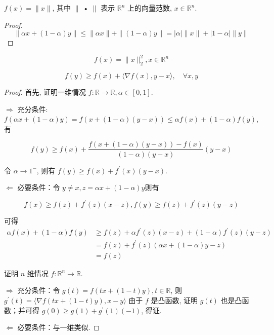 \begin{example}
    \label{Example:NormIsConvex}
    $ f(x)=\|x\| $, 其中 $ \| $ • $ \| $ 表示 $ \mathbb{R}^{n} $ 上的向量范数, $ x \in \mathbb{R}^{n} $.
\end{example}

\begin{proof}
    \label{Example:L2NormIsConvex}
    $$ \|\alpha x+(1-\alpha) y\| \leq\|\alpha x\|+\|(1-\alpha) y\|=|\alpha|\|x\|+|1-\alpha|\|y\| $$
\end{proof}

\begin{example}
    $$ f(x)=\|x\|_{2}^{2}, x \in \mathbb{R}^{n} $$
\end{example}

\begin{theorem}
    \label{Theorem:ConvexDiffential}
    $$ f(y) \geq f(x)+\langle\nabla f(x), y-x\rangle, \quad \forall x, y $$
\end{theorem}

\begin{proof}
    首先, 证明一维情况 $ f: \mathbb{R} \rightarrow \mathbb{R}, \alpha \in[0,1] $.

    $ \Rightarrow  $ 充分条件: $ f(\alpha x+(1-\alpha) y)=f(x+(1-\alpha)(y-x)) \leq \alpha f(x)+(1-\alpha) f(y) $,有

    $$ f(y) \geq f(x)+\frac{f(x+(1-\alpha)(y-x))-f(x)}{(1-\alpha)(y-x)}(y-x) $$

    令 $ \alpha \rightarrow 1^- $, 则有 $ f(y) \geq f(x)+f^{\prime}(x)(y-x) $.

    $ \Leftarrow  $ 必要条件：令 $ y \neq x, z=\alpha x+(1-\alpha) y$则有

    $$  f(x) \geq f(z)+f^{\prime}(z)(x-z), f(y) \geq f(z)+f^{\prime}(z)(y-z)  $$

    可得 
    $$\begin{aligned}
        \alpha f(x)+(1-\alpha) f(y) &\geq f(z)+\alpha f^{\prime}(z)(x-z)+(1-\alpha) f^{\prime}(z)(y-z) \\
        &=f(z)+f^{\prime}(z)(\alpha x+(1-\alpha) y-z) \\
        &=f(z)
    \end{aligned}
    $$

    证明 $ n $ 维情况 $ f: \mathbb{R}^{n} \rightarrow \mathbb{R} $.

    $ \Rightarrow $ 充分条件：令 $ g(t)=f(t x+(1-t) y), t \in \mathbb{R} $, 则 $ g^{\prime}(t)=\langle\nabla f(t x+(1-t) y), x-y\rangle $ 由于 $ f $ 是凸函数, 证明 $ g(t) $ 也是凸函数；并可得 $ g(0) \geq g(1)+g^{\prime}(1)(-1) $, 得证.

    $ \Leftarrow $ 必要条件：与一维类似. 
\end{proof}

